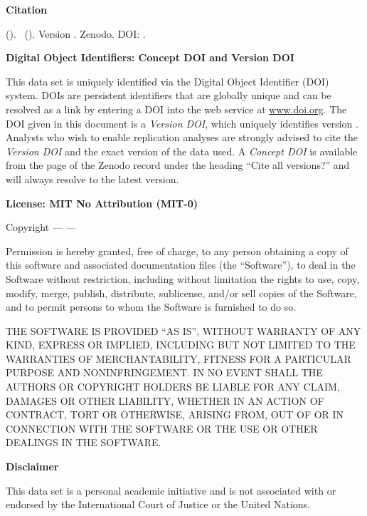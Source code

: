 \textbf{Citation}

\emph{\dataauthor} (\the\year ). \softwaretitle\ (\softwareshort ). Version \version . Zenodo. DOI: \softwareversiondoi .

\vspace{0.5cm}

\textbf{Digital Object Identifiers: Concept DOI and Version DOI}

This data set is uniquely identified via the Digital Object Identifier (DOI) system. DOIs are persistent identifiers that are globally unique and can be resolved as a link by entering a DOI into the web service at \url{www.doi.org}. The DOI given in this document is a \emph{Version DOI}, which uniquely identifies version \version. Analysts who wish to enable replication analyses are strongly advised to cite the \emph{Version DOI} and the exact version of the data used. A \emph{Concept DOI} is available from the page of the Zenodo record under the heading \enquote{Cite all versions?} and will always resolve to the latest version.

\vspace{0.5cm}



\textbf{License: MIT No Attribution (MIT-0)}

Copyright --- \the\year --- \dataauthor

Permission is hereby granted, free of charge, to any person obtaining a copy of this software and associated documentation files (the \enquote{Software}), to deal in the Software without restriction, including without limitation the rights to use, copy, modify, merge, publish, distribute, sublicense, and/or sell copies of the Software, and to permit persons to whom the Software is furnished to do so.

 
THE SOFTWARE IS PROVIDED \enquote{AS IS}, WITHOUT WARRANTY OF ANY KIND, EXPRESS OR IMPLIED, INCLUDING BUT NOT LIMITED TO THE WARRANTIES OF MERCHANTABILITY, FITNESS FOR A PARTICULAR PURPOSE AND NONINFRINGEMENT. IN NO EVENT SHALL THE AUTHORS OR COPYRIGHT HOLDERS BE LIABLE FOR ANY CLAIM, DAMAGES OR OTHER LIABILITY, WHETHER IN AN ACTION OF CONTRACT, TORT OR OTHERWISE, ARISING FROM, OUT OF OR IN CONNECTION WITH THE SOFTWARE OR THE USE OR OTHER DEALINGS IN THE SOFTWARE. 

\vspace{0.5cm}

\textbf{Disclaimer} 

This data set is a personal academic initiative and is not associated with or endorsed by the International Court of Justice or the United Nations.


\newpage